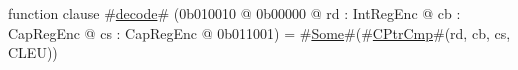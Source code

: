 function clause #\hyperref[zdecode]{decode}# (0b010010 @ 0b00000 @ rd : IntRegEnc @ cb : CapRegEnc @ cs : CapRegEnc @ 0b011001) = #\hyperref[zSome]{Some}#(#\hyperref[zCPtrCmp]{CPtrCmp}#(rd, cb, cs, CLEU))
